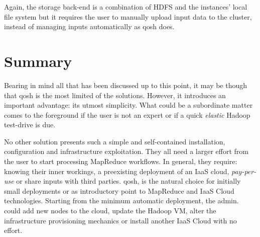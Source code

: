 Again, the storage back-end is a combination of HDFS and the instances' local file system but it requires the user to manually upload input data to the cluster, instead of managing inputs automatically as qosh does.

\section{Summary}\label{sec:resumenconclusiones}
\noindent Bearing in mind all that has been discussed up to this point, it may be though that qosh is the most limited of the solutions. However, it introduces an important advantage: its utmost simplicity. What could be a subordinate matter comes to the foreground if the user is not an expert or if a quick \emph{elastic} Hadoop test-drive is due.

No other solution presents such a simple and self-contained installation, configuration and infrastructure exploitation. They all need a larger effort from the user to start processing MapReduce workflows. In general, they require: knowing their inner workings, a preexisting deployment of an IaaS cloud, \emph{pay-per-use} or share inputs with third parties. qosh, is the natural choice for initially small deployments or as introductory point to MapReduce and IaaS Cloud technologies. Starting from the minimum automatic deployment, the admin. could add new nodes to the cloud, update the Hadoop VM, alter the infrastructure provisioning mechanics or install another IaaS Cloud with no effort.
